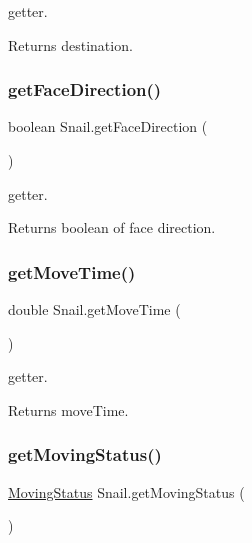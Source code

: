 getter. \begin{DoxyReturn}{Returns}
destination. 
\end{DoxyReturn}
\mbox{\label{class_snail_aea3bd82a39b5054e8b1c096a163d22ac}} 
\subsubsection{\texorpdfstring{get\+Face\+Direction()}{getFaceDirection()}}
{\footnotesize\ttfamily boolean Snail.\+get\+Face\+Direction (\begin{DoxyParamCaption}{ }\end{DoxyParamCaption})\hspace{0.3cm}{\ttfamily [inline]}}

getter. \begin{DoxyReturn}{Returns}
boolean of face direction. 
\end{DoxyReturn}
\mbox{\label{class_snail_a178f903a2db7511a95ee194eeba7c00a}} 
\subsubsection{\texorpdfstring{get\+Move\+Time()}{getMoveTime()}}
{\footnotesize\ttfamily double Snail.\+get\+Move\+Time (\begin{DoxyParamCaption}{ }\end{DoxyParamCaption})\hspace{0.3cm}{\ttfamily [inline]}}

getter. \begin{DoxyReturn}{Returns}
move\+Time. 
\end{DoxyReturn}
\mbox{\label{class_snail_a454a3cf01af0437da61e1a503ca2bb30}} 
\subsubsection{\texorpdfstring{get\+Moving\+Status()}{getMovingStatus()}}
{\footnotesize\ttfamily \mbox{\hyperlink{enum_moving_object_1_1_moving_status}{Moving\+Status}} Snail.\+get\+Moving\+Status (\begin{DoxyParamCaption}{ }\end{DoxyParamCaption})\hspace{0.3cm}{\ttfamily [inline]}}

